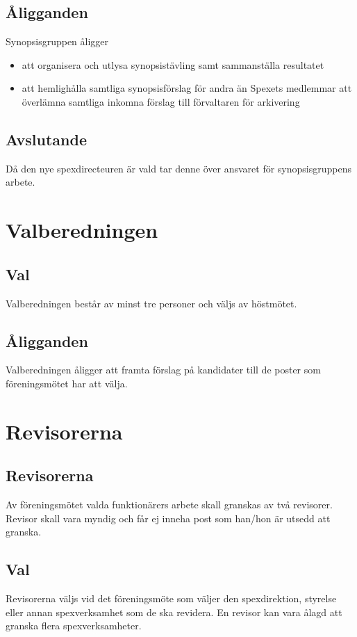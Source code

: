 \documentclass[a4paper]{article}
\begin{document}
\subsection{Åligganden}
Synopsisgruppen åligger

\begin{itemize}
  \item att organisera och utlysa synopsistävling samt sammanställa resultatet
  \item att hemlighålla samtliga synopsisförslag för andra än Spexets medlemmar att överlämna samtliga inkomna förslag till förvaltaren för arkivering
\end{itemize}

\subsection{Avslutande}
Då den nye spexdirecteuren är vald tar denne över ansvaret för synopsisgruppens arbete.

\section{Valberedningen}
\label{section:valberedningen}

\subsection{Val}
Valberedningen består av minst tre personer och väljs av höstmötet.

\subsection{Åligganden}
Valberedningen åligger att framta förslag på kandidater till de poster som föreningsmötet har att välja.

\section{Revisorerna}
\label{section:revisorerna}

\subsection{Revisorerna}
Av föreningsmötet valda funktionärers arbete skall granskas av två revisorer. Revisor skall vara myndig och får ej inneha post som han/hon är utsedd att granska.

\subsection{Val}
Revisorerna väljs vid det föreningsmöte som väljer den spexdirektion, styrelse eller annan spexverksamhet som de ska revidera. En revisor kan vara ålagd att granska flera spexverksamheter.
\end{document}
